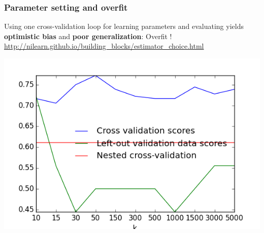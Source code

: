 \begin{frame}
\frametitle{Parameter setting and overfit} 

Using one cross-validation loop for learning parameters and evaluating
yields \textbf{optimistic bias} and \textbf{poor generalization}:
Overfit ! {\tiny \url{http://nilearn.github.io/building_blocks/estimator_choice.html}}

\includegraphics[width=.8\textwidth]{sklearn_material/plot_haxby_grid_search_11.png}

\end{frame}
